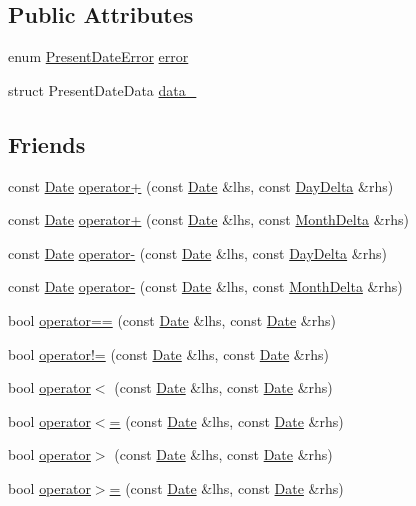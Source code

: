 \subsection*{\-Public \-Attributes}
\begin{DoxyCompactItemize}
\item 
enum \hyperlink{date_8h_a42798e6b91456e88f492437d3e826c0b}{\-Present\-Date\-Error} \hyperlink{structDate_adb2a42cb857f6462788b856b2f60cfb2}{error}
\item 
struct \-Present\-Date\-Data \hyperlink{structDate_a15a7ce699435bf3c9c60bfff5e1806de}{data\-\_\-}
\end{DoxyCompactItemize}
\subsection*{\-Friends}
\begin{DoxyCompactItemize}
\item 
const \hyperlink{structDate}{\-Date} \hyperlink{structDate_a88a01e03ad6e96a22ee81ed7a38bdd5a}{operator+} (const \hyperlink{structDate}{\-Date} \&lhs, const \hyperlink{structDayDelta}{\-Day\-Delta} \&rhs)
\item 
const \hyperlink{structDate}{\-Date} \hyperlink{structDate_a0c895c337e87874cc232482d703db30e}{operator+} (const \hyperlink{structDate}{\-Date} \&lhs, const \hyperlink{structMonthDelta}{\-Month\-Delta} \&rhs)
\item 
const \hyperlink{structDate}{\-Date} \hyperlink{structDate_a10a73b5010e589b98f3929f9b36e2387}{operator-\/} (const \hyperlink{structDate}{\-Date} \&lhs, const \hyperlink{structDayDelta}{\-Day\-Delta} \&rhs)
\item 
const \hyperlink{structDate}{\-Date} \hyperlink{structDate_a61933f732562f4d15602110136ad536c}{operator-\/} (const \hyperlink{structDate}{\-Date} \&lhs, const \hyperlink{structMonthDelta}{\-Month\-Delta} \&rhs)
\item 
bool \hyperlink{structDate_a27425be265a0cc57e4f731825154ec4d}{operator==} (const \hyperlink{structDate}{\-Date} \&lhs, const \hyperlink{structDate}{\-Date} \&rhs)
\item 
bool \hyperlink{structDate_ad12683e4457513f4f834e13c4e7f72f8}{operator!=} (const \hyperlink{structDate}{\-Date} \&lhs, const \hyperlink{structDate}{\-Date} \&rhs)
\item 
bool \hyperlink{structDate_a611ba98c72bec2ae82bbf086b81563ef}{operator$<$} (const \hyperlink{structDate}{\-Date} \&lhs, const \hyperlink{structDate}{\-Date} \&rhs)
\item 
bool \hyperlink{structDate_acacb699d0fcffd2443c121586b7c22da}{operator$<$=} (const \hyperlink{structDate}{\-Date} \&lhs, const \hyperlink{structDate}{\-Date} \&rhs)
\item 
bool \hyperlink{structDate_a4e4faf476e7d66ef88aaca8b11a60175}{operator$>$} (const \hyperlink{structDate}{\-Date} \&lhs, const \hyperlink{structDate}{\-Date} \&rhs)
\item 
bool \hyperlink{structDate_aa72d3f6e17c7aab4d16e9e50b5069e1a}{operator$>$=} (const \hyperlink{structDate}{\-Date} \&lhs, const \hyperlink{structDate}{\-Date} \&rhs)
\end{DoxyCompactItemize}



